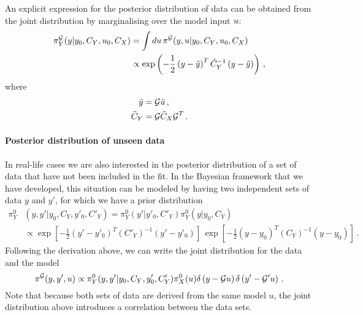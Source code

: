 An explicit expression for the posterior distribution of data can be obtained
from the joint distribution by marginalising over the model input $u$:
\begin{align}
  \label{eq:PosteriorDataSpace}
  \pi_{Y}^{\mathcal{G}}(y|y_0,C_{Y},u_0,C_X)
  &= \int du\, 
  \pi^{\mathcal{G}}(y,u|y_0,C_{Y},u_0,C_X) \\
  &\propto \exp\left(
    -\frac12 \left(y - \tilde{y}\right)^T \tilde{C}_Y^{-1}
    \left(y - \tilde{y}\right)
  \right)\, ,
\end{align}
where
\begin{align}
  \label{eq:PosteriorDataParamsMean}
  \tilde{y} &= \mathcal{G} \tilde{u}\, , \\
  \label{eq:PosteriorDataParamsCov}
  \tilde{C}_Y &= \mathcal{G} \tilde{C}_X \mathcal{G}^T\, .
\end{align}

\paragraph{Posterior distribution of unseen data}

In real-life cases we are also interested in the posterior distribution of a set
of data that have not been included in the fit. In the Bayesian framework that
we have developed, this situation can be modeled by having two independent sets
of data $y$ and $y'$, for which we have a prior distribution 
\begin{align}
  \label{eq:JointIndepDataPrior}
  \pi_{Y}^0&\left(y,y'|y_0,C_{Y},y'_0,C'_{Y}\right) 
   = \pi_{Y}^0\left(y'|y'_0,C'_{Y}\right) \pi_{Y}^0\left(y|y_0,C_{Y}\right) \\
  & \propto 
  \exp\left[-\frac12 \left(y'-y'_0\right)^T (C'_{Y})^{-1} 
  \left(y'-y'_0\right)\right]\, 
  \exp\left[-\frac12 \left(y-y_0\right)^T (C_{Y})^{-1} 
  \left(y-y_0\right)\right]\, .
\end{align}
Following the derivation above, we can write the joint distribution for the data
and the model 
\begin{equation}
  \label{eq:JointModelData}
  \pi^{\mathcal{G}}(y,y',u) 
  \propto 
  \pi_{Y}^0(y,y'|y_0,C_{Y},y'_0,C'_{Y}) 
  \pi_{X}^0(u) 
  \delta\left(y - \mathcal{G}u\right)
  \delta\left(y'- \mathcal{G}'u\right)\, .
\end{equation}
Note that because both sets of data are derived from the same model $u$, the
joint distribution above introduces a correlation between the data sets. 

